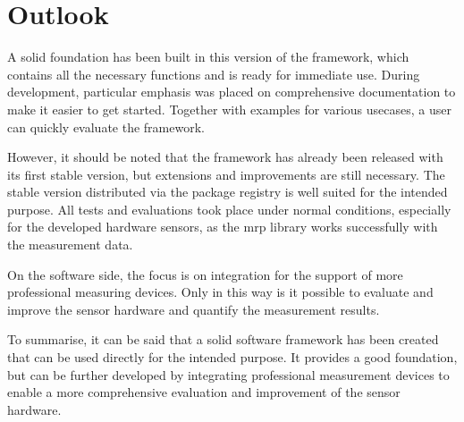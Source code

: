 \hypertarget{outlook}{%
\section{Outlook}\label{outlook}}

A solid foundation has been built in this version of the framework,
which contains all the necessary functions and is ready for immediate
use. During development, particular emphasis was placed on comprehensive
documentation to make it easier to get started. Together with examples
for various usecases, a user can quickly evaluate the framework.

However, it should be noted that the framework has already been released
with its first stable version, but extensions and improvements are still
necessary. The stable version distributed via the package registry is
well suited for the intended purpose. All tests and evaluations took
place under normal conditions, especially for the developed hardware
sensors, as the \gls{mrp} library works successfully with the
measurement data.

On the software side, the focus is on integration for the support of
more professional measuring devices. Only in this way is it possible to
evaluate and improve the sensor hardware and quantify the measurement
results.

To summarise, it can be said that a solid software framework has been
created that can be used directly for the intended purpose. It provides
a good foundation, but can be further developed by integrating
professional measurement devices to enable a more comprehensive
evaluation and improvement of the sensor hardware.

